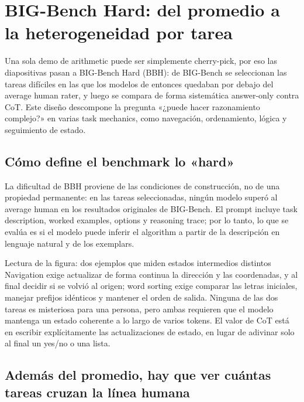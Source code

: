 \section{BIG-Bench Hard: del promedio a la heterogeneidad por tarea}

Una sola demo de arithmetic puede ser simplemente cherry-pick, por eso las diapositivas pasan a BIG-Bench Hard (BBH): de BIG-Bench se seleccionan las tareas difíciles en las que los modelos de entonces quedaban por debajo del average human rater, y luego se compara de forma sistemática answer-only contra CoT. Este diseño descompone la pregunta «¿puede hacer razonamiento complejo?» en varias task mechanics, como navegación, ordenamiento, lógica y seguimiento de estado.

\subsection{Cómo define el benchmark lo «hard»}

La dificultad de BBH proviene de las condiciones de construcción, no de una propiedad permanente: en las tareas seleccionadas, ningún modelo superó al average human en los resultados originales de BIG-Bench. El prompt incluye task description, worked examples, options y reasoning trace; por lo tanto, lo que se evalúa es si el modelo puede inferir el algorithm a partir de la descripción en lenguaje natural y de los exemplars.


\begin{knowledgebox}{Lectura de la figura: dos ejemplos que miden estados intermedios distintos}
Navigation exige actualizar de forma continua la dirección y las coordenadas, y al final decidir si se volvió al origen; word sorting exige comparar las letras iniciales, manejar prefijos idénticos y mantener el orden de salida. Ninguna de las dos tareas es misteriosa para una persona, pero ambas requieren que el modelo mantenga un estado coherente a lo largo de varios tokens. El valor de CoT está en escribir explícitamente las actualizaciones de estado, en lugar de adivinar solo al final un yes/no o una lista.
\end{knowledgebox}

\subsection{Además del promedio, hay que ver cuántas tareas cruzan la línea humana}

